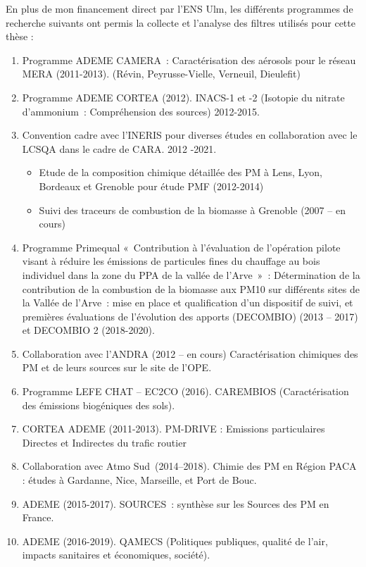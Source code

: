 
En plus de mon financement direct par l'ENS Ulm, les différents programmes de recherche
suivants ont permis la collecte et l'analyse des filtres utilisés pour cette thèse :

\begin{enumerate}
    \item Programme ADEME CAMERA : Caractérisation des aérosols pour le réseau MERA (2011-2013). (Révin, Peyrusse-Vielle, Verneuil, Dieulefit)
    \item Programme ADEME CORTEA (2012). INACS-1 et -2 (Isotopie du nitrate d’ammonium : Compréhension des sources) 2012-2015. 
    \item Convention cadre avec l’INERIS pour diverses études en collaboration avec le LCSQA dans le cadre de CARA. 2012 -2021. 
        \begin{itemize}
            \item Etude de la composition chimique détaillée des PM à Lens, Lyon, Bordeaux et Grenoble pour étude PMF (2012-2014) 
            \item Suivi des traceurs de combustion de la biomasse à Grenoble (2007 – en cours) 
        \end{itemize}
    \item Programme Primequal « Contribution à l’évaluation de l’opération pilote visant à
        réduire les émissions de particules fines du chauffage au bois individuel dans la
        zone du PPA de la vallée de l'Arve » : Détermination de la contribution de la
        combustion de la biomasse aux PM10 sur différents sites de la Vallée de l’Arve :
        mise en place et qualification d’un dispositif de suivi, et premières évaluations
        de l’évolution des apports (DECOMBIO) (2013 -- 2017) et DECOMBIO 2 (2018-2020). 
    \item Collaboration avec l’ANDRA (2012 -- en cours) Caractérisation chimiques des PM et de leurs sources sur le site de l’OPE. 
    \item Programme LEFE CHAT – EC2CO (2016). CAREMBIOS (Caractérisation des émissions biogéniques des sols). 
    \item CORTEA ADEME (2011-2013). PM-DRIVE : Emissions particulaires Directes et Indirectes du trafic routier 
    \item Collaboration avec Atmo Sud (2014--2018). Chimie des PM en Région PACA : études à Gardanne, Nice, Marseille, et Port de Bouc. 
    \item ADEME (2015-2017). SOURCES : synthèse sur les Sources des PM en France. 
    \item ADEME (2016-2019). QAMECS (Politiques publiques, qualité de l’air, impacts sanitaires et économiques, société). 

\end{enumerate}
